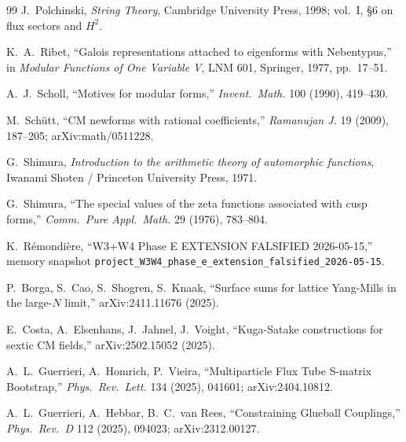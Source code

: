 \documentclass[11pt]{amsart}
\theoremstyle{definition}
\theoremstyle{remark}
\begin{document}
\begin{thebibliography}{99}
 J.~Polchinski, \emph{String Theory},
Cambridge University Press, 1998; vol.~I, \S 6 on flux sectors and
$H^2$.

 K.~A.~Ribet, ``Galois representations attached
to eigenforms with Nebentypus,'' in \emph{Modular Functions of One
Variable V}, LNM 601, Springer, 1977, pp.~17--51.

 A.~J.~Scholl, ``Motives for modular forms,''
\emph{Invent.\ Math.} 100 (1990), 419--430.

 M.~Sch\"utt, ``CM newforms with rational
coefficients,'' \emph{Ramanujan J.} 19 (2009), 187--205;
arXiv:math/0511228.

 G.~Shimura, \emph{Introduction to the arithmetic
theory of automorphic functions}, Iwanami Shoten / Princeton
University Press, 1971.

 G.~Shimura, ``The special values of the zeta
functions associated with cusp forms,'' \emph{Comm.\ Pure Appl.\ Math.}
29 (1976), 783--804.

 K.~R\'emondi\`ere, ``W3+W4 Phase E EXTENSION
FALSIFIED 2026-05-15,'' memory snapshot
\texttt{project\_W3W4\_phase\_e\_extension\_falsified\_2026-05-15}.

 P.~Borga, S.~Cao, S.~Shogren, S.~Knaak,
``Surface sums for lattice Yang-Mills in the large-$N$ limit,''
arXiv:2411.11676 (2025).

 E.~Costa, A.~Elsenhans, J.~Jahnel, J.~Voight,
``Kuga-Satake constructions for sextic CM fields,''
arXiv:2502.15052 (2025).

 A.~L.~Guerrieri, A.~Homrich,
P.~Vieira, ``Multiparticle Flux Tube S-matrix Bootstrap,''
\emph{Phys.\ Rev.\ Lett.} 134 (2025), 041601; arXiv:2404.10812.

 A.~L.~Guerrieri, A.~Hebbar,
B.~C.~van Rees, ``Constraining Glueball Couplings,''
\emph{Phys.\ Rev.\ D} 112 (2025), 094023; arXiv:2312.00127.

\end{thebibliography}
\end{document}
